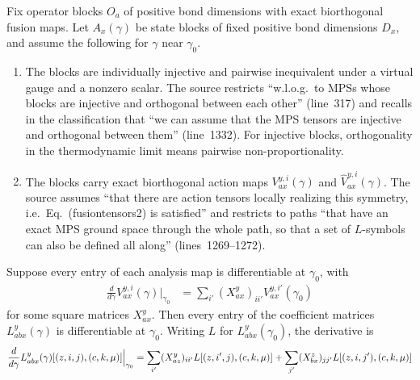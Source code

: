 \begin{lemma}
    \leanok
    \label{lem:glm_l_path_first_order}
    Fix operator blocks $O_a$ of positive bond dimensions with exact
    biorthogonal fusion maps. Let $A_x(\gamma)$ be state blocks of fixed
    positive bond dimensions $D_x$, and assume the following for $\gamma$
    near $\gamma_0$.
    \begin{enumerate}
        \item The blocks are individually injective and pairwise
              inequivalent under a virtual gauge and a nonzero scalar. The
              source restricts ``w.l.o.g.\ to MPSs whose blocks are
              injective and orthogonal between each other'' (line~317) and
              recalls in the classification that ``we can assume that the MPS
              tensors are injective and orthogonal between them''
              (line~1332). For injective blocks, orthogonality in the
              thermodynamic limit means pairwise non-proportionality.
        \item The blocks carry exact biorthogonal action maps
              $V_{ax}^{y,i}(\gamma)$ and $\widehat V_{ax}^{y,i}(\gamma)$. The
              source assumes ``that there are action tensors locally realizing
              this symmetry, i.e.\ Eq.\ (fusiontensors2) is satisfied'' and
              restricts to paths ``that have an exact MPS ground space through
              the whole path, so that a set of $L$-symbols can also be defined
              all along'' (lines~1269--1272).
    \end{enumerate}
    Suppose every entry of each analysis map is differentiable at
    $\gamma_0$, with
    \begin{align}
        \frac{d}{d\gamma}V_{ax}^{y,i}(\gamma)\Big|_{\gamma_0}
         & =\sum_{i'}(X_{ax}^y)_{ii'}V_{ax}^{y,i'}(\gamma_0)
        \label{eq:glm_l_path_span}
    \end{align}
    for some square matrices $X_{ax}^y$. Then every entry of the
    coefficient matrices $L_{abx}^y(\gamma)$ is differentiable at
    $\gamma_0$. Writing $L$ for $L_{abx}^y(\gamma_0)$, the derivative is
    \begin{align}
        \frac{d}{d\gamma}L_{abx}^y(\gamma)[(z,i,j),(c,k,\mu)]\Big|_{\gamma_0}
         & =\sum_{i'}(X_{az}^y)_{ii'}L[(z,i',j),(c,k,\mu)]
        +\sum_{j'}(X_{bx}^z)_{jj'}L[(z,i,j'),(c,k,\mu)]
        \notag                                                   \\

\end{align}
\end{lemma}
